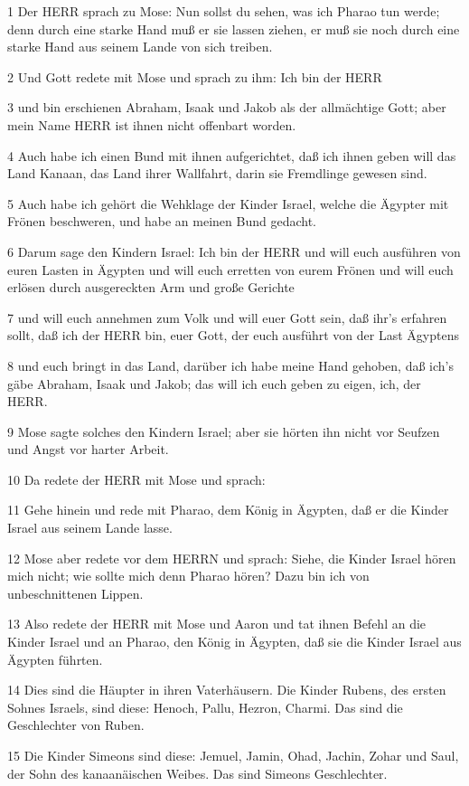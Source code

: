 \par 1 Der HERR sprach zu Mose: Nun sollst du sehen, was ich Pharao tun werde; denn durch eine starke Hand muß er sie lassen ziehen, er muß sie noch durch eine starke Hand aus seinem Lande von sich treiben.
\par 2 Und Gott redete mit Mose und sprach zu ihm: Ich bin der HERR
\par 3 und bin erschienen Abraham, Isaak und Jakob als der allmächtige Gott; aber mein Name HERR ist ihnen nicht offenbart worden.
\par 4 Auch habe ich einen Bund mit ihnen aufgerichtet, daß ich ihnen geben will das Land Kanaan, das Land ihrer Wallfahrt, darin sie Fremdlinge gewesen sind.
\par 5 Auch habe ich gehört die Wehklage der Kinder Israel, welche die Ägypter mit Frönen beschweren, und habe an meinen Bund gedacht.
\par 6 Darum sage den Kindern Israel: Ich bin der HERR und will euch ausführen von euren Lasten in Ägypten und will euch erretten von eurem Frönen und will euch erlösen durch ausgereckten Arm und große Gerichte
\par 7 und will euch annehmen zum Volk und will euer Gott sein, daß ihr's erfahren sollt, daß ich der HERR bin, euer Gott, der euch ausführt von der Last Ägyptens
\par 8 und euch bringt in das Land, darüber ich habe meine Hand gehoben, daß ich's gäbe Abraham, Isaak und Jakob; das will ich euch geben zu eigen, ich, der HERR.
\par 9 Mose sagte solches den Kindern Israel; aber sie hörten ihn nicht vor Seufzen und Angst vor harter Arbeit.
\par 10 Da redete der HERR mit Mose und sprach:
\par 11 Gehe hinein und rede mit Pharao, dem König in Ägypten, daß er die Kinder Israel aus seinem Lande lasse.
\par 12 Mose aber redete vor dem HERRN und sprach: Siehe, die Kinder Israel hören mich nicht; wie sollte mich denn Pharao hören? Dazu bin ich von unbeschnittenen Lippen.
\par 13 Also redete der HERR mit Mose und Aaron und tat ihnen Befehl an die Kinder Israel und an Pharao, den König in Ägypten, daß sie die Kinder Israel aus Ägypten führten.
\par 14 Dies sind die Häupter in ihren Vaterhäusern. Die Kinder Rubens, des ersten Sohnes Israels, sind diese: Henoch, Pallu, Hezron, Charmi. Das sind die Geschlechter von Ruben.
\par 15 Die Kinder Simeons sind diese: Jemuel, Jamin, Ohad, Jachin, Zohar und Saul, der Sohn des kanaanäischen Weibes. Das sind Simeons Geschlechter.
